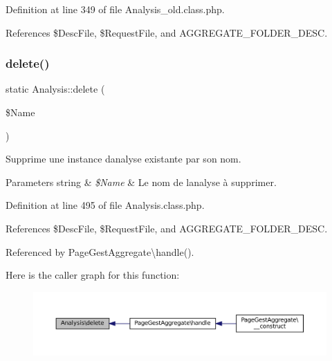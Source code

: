 Definition at line 349 of file Analysis\+\_\+old.\+class.\+php.



References \$\+Desc\+File, \$\+Request\+File, and A\+G\+G\+R\+E\+G\+A\+T\+E\+\_\+\+F\+O\+L\+D\+E\+R\+\_\+\+D\+E\+SC.

\mbox{\label{class_analysis_a68eb05f2f03dae12ec9be8a5137fb27d}} 
\subsubsection{\texorpdfstring{delete()}{delete()}\hspace{0.1cm}{\footnotesize\ttfamily [2/2]}}
{\footnotesize\ttfamily static Analysis\+::delete (\begin{DoxyParamCaption}\item[{}]{\$\+Name }\end{DoxyParamCaption})\hspace{0.3cm}{\ttfamily [static]}}

Supprime une instance d\textquotesingle{}analyse existante par son nom. 
\begin{DoxyParams}[1]{Parameters}
string & {\em \$\+Name} & Le nom de l\textquotesingle{}analyse à supprimer. \\
\hline
\end{DoxyParams}


Definition at line 495 of file Analysis.\+class.\+php.



References \$\+Desc\+File, \$\+Request\+File, and A\+G\+G\+R\+E\+G\+A\+T\+E\+\_\+\+F\+O\+L\+D\+E\+R\+\_\+\+D\+E\+SC.



Referenced by Page\+Gest\+Aggregate\textbackslash{}handle().

Here is the caller graph for this function\+:\nopagebreak
\begin{figure}[H]
\begin{center}
\leavevmode
\includegraphics[width=350pt]{class_analysis_a68eb05f2f03dae12ec9be8a5137fb27d_icgraph}
\end{center}
\end{figure}
\mbox{\label{class_analysis_a8ef8111878a5fd011b7702a8d068ca74}} 
